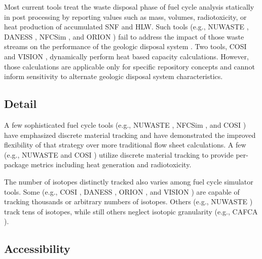 Most current tools treat the waste disposal 
phase of fuel cycle analysis statically in post processing by reporting 
values such as mass, volumes, radiotoxicity, or heat production of accumulated 
\gls{SNF} and \gls{HLW}. Such tools 
(e.g.,
\gls{NUWASTE} \cite{abkowitz_nuclear_2010},
\gls{DANESS} \cite{yacout_daness_2011,van_den_durpel_daness:_2006}, 
\gls{NFCSim} \cite{schneider_nfcsim_2004}, and
ORION \cite{gregg_orion_2011}
) 
fail to address the impact of those waste streams on the performance of the 
geologic disposal system \cite{wilson_comparing_2011}.  Two tools, \gls{COSI} 
\cite{boucher_international_2010} and \gls{VISION} \cite{yacout_vision_2006, 
wilson_comparing_2011, radel_repository_2007, boucher_international_2010}, 
dynamically perform heat based capacity calculations.
However, those calculations are applicable only for specific 
repository concepts and cannot inform sensitivity to alternate geologic disposal 
system characteristics.  

\subsection{Detail}

A few sophisticated fuel cycle tools  (e.g.,
\gls{NUWASTE} \cite{abkowitz_nuclear_2010},
\gls{NFCSim} \cite{schneider_nfcsim_2004}, and 
\gls{COSI} \cite{boucher_international_2010}) have emphasized discrete material 
tracking and have demonstrated the improved flexibility of that strategy over more 
traditional flow sheet calculations. A few (e.g., 
\gls{NUWASTE} \cite{abkowitz_nuclear_2010} and
\gls{COSI} \cite{boucher_international_2010}
) utilize discrete material tracking to 
provide per-package metrics including heat generation and radiotoxicity. 


The number of isotopes distinctly tracked also varies among fuel cycle 
simulator tools. Some (e.g., 
\gls{COSI} \cite{boucher_international_2010},
\gls{DANESS} \cite{yacout_daness_2011,van_den_durpel_daness:_2006}, 
ORION \cite{gregg_orion_2011}, and
\gls{VISION} \cite{yacout_vision_2006, wilson_comparing_2011, radel_repository_2007, boucher_international_2010}
) are capable of tracking thousands or arbitrary numbers of isotopes. Others (e.g., 
\gls{NUWASTE} \cite{abkowitz_nuclear_2010}) track tens of isotopes, while still 
others neglect isotopic granularity (e.g., 
\gls{CAFCA} \cite{guerin_impact_2009}).

\subsection{Accessibility}

